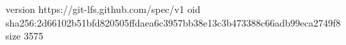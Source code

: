 version https://git-lfs.github.com/spec/v1
oid sha256:2d66102b51bfd820505ffdaea6c3957bb38e13c3b473388c66adb99eca2749f8
size 3575
